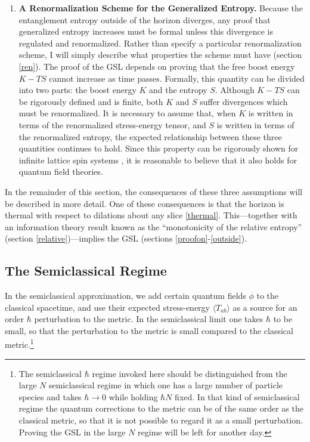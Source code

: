 \documentclass{article}
\begin{document}
\begin{enumerate}
\item \textbf{A Renormalization Scheme for the Generalized Entropy.}  Because the entanglement entropy outside of the horizon diverges, any proof that generalized entropy increases must be formal unless this divergence is regulated and renormalized.  Rather than specify a particular renormalization scheme, I will simply describe what properties the scheme must have (section \ref{ren}).  The proof of the GSL depends on proving that the free boost energy $K - TS$ cannot increase as time passes.  Formally, this quantity can be divided into two parts: the boost energy $K$ and the entropy $S$.  Although $K - TS$ can be rigorously defined and is finite, both $K$ and $S$ suffer divergences which must be renormalized.  It is necessary to assume that, when $K$ is written in terms of the renormalized stress-energy tensor, and $S$ is written in terms of the renormalized entropy, the expected relationship between these three quantities continues to hold.  Since this property can be rigorously shown for infinite lattice spin systems \cite{AS77}, it is reasonable to believe that it also holds for quantum field theories.
\end{enumerate}

\noindent In the remainder of this section, the consequences of these three assumptions will be described in more detail.  One of these consequences is that the horizon is thermal with respect to dilations about any slice \ref{thermal}.  This---together with an information theory result known as the ``monotonicity of the relative entropy'' (section \ref{relative})---implies the GSL (sections \ref{proofon}-\ref{outside}).

\subsection{The Semiclassical Regime}\label{sreg}

In the semiclassical approximation, we add certain quantum fields $\phi$ to the classical spacetime, and use their expected stress-energy $\langle T_{ab} \rangle$ as a source for an order $\hbar$ perturbation to the metric.  In the semiclassical limit one takes $\hbar$ to be small, so that the perturbation to the metric is small compared to the classical metric.\footnote{The semiclassical $\hbar$ regime invoked here should be distinguished from the large $N$ semiclassical regime in which one has a large number of particle species and takes $\hbar \to 0$ while holding $\hbar N$ fixed.  In that kind of semiclassical regime the quantum corrections to the metric can be of the same order as the classical metric, so that it is not possible to regard it as a small perturbation.  Proving the GSL in the large $N$ regime will be left for another day.}
\end{document}
